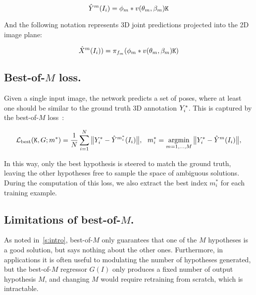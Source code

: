 \begin{equation}
  \hat Y^{m}(I_{i}) = \phi_{m} * v(\theta_{m},\beta_{m})\mathtt{K}
\end{equation}

And the following notation represents 3D joint predictions projected into the 2D image plane:

\begin{equation}
  \hat X^{m}(I_{i})) = \pi_{f_{m}}(\phi_{m} * v(\theta_{m},\beta_{m})\mathtt{K})
\end{equation}
  

\subsection{Best-of-$M$ loss.}
Given a single input image, the network predicts a set of poses, where at least one should be similar to the ground truth 3D annotation $Y^{*}_{i}$.
This is captured by the best-of-$M$ loss~\cite{guzman2012multiple}:

\begin{equation}\label{e:loss-best}
  \mathcal{L}_\text{best}(\jointselect,G;m^*)
  =
  \frac{1}{N}
  \sum_{i=1}^N
  \big \| \inputjtsthree_{i}- \hat Y^{m_i^*}(I_i) \big \|,
  ~~
  m_i^*
  =
  \operatornamewithlimits{argmin}_{m=1,\dots,M}
  \big \| \inputjtsthree_{i} -  \hat Y^{m}(I_i) \big \|,
\end{equation}

In this way, only the best hypothesis is steered to match the ground truth, leaving the other hypotheses free to sample the space of ambiguous solutions.
During the computation of this loss, we also extract the best index $m^*_i$ for each training example.

\subsection{Limitations of best-of-$M$.}

As noted in~\cref{s:intro}, best-of-$M$ only guarantees that one of the $M$ hypotheses is a good solution, but says nothing about the other ones.
Furthermore, in applications it is often useful to modulating the number of hypotheses generated, but the best-of-$M$ regressor $G(I)$ only produces a fixed number of output hypothesis $M$, and changing $M$ would require retraining from scratch, which is intractable.

